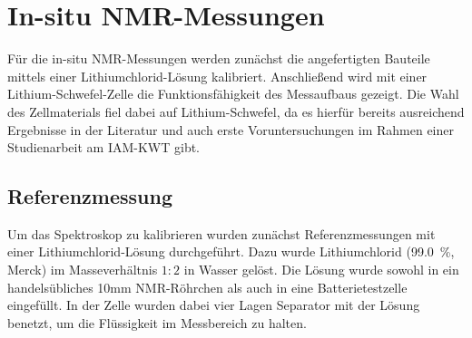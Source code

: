 \documentclass[a4paper, 11pt, headsepline,footsepline,twoside,abstract]{scrbook}
\begin{document}
\section{In-situ NMR-Messungen}
Für die in-situ NMR-Messungen werden zunächst die angefertigten Bauteile mittels einer Lithiumchlorid-Lösung kalibriert. Anschließend wird mit einer Lithium-Schwefel-Zelle die Funktionsfähigkeit des Messaufbaus gezeigt. Die Wahl des Zellmaterials fiel dabei auf Lithium-Schwefel, da es hierfür bereits ausreichend Ergebnisse in der Literatur und auch erste Voruntersuchungen im Rahmen einer Studienarbeit am IAM-KWT gibt.
\subsection{Referenzmessung}
Um das Spektroskop zu kalibrieren wurden zunächst Referenzmessungen mit einer Lithium\-chlorid-Lösung durchgeführt. Dazu wurde Lithiumchlorid (\SI{99.0}{\percent}, Merck) im Masseverhältnis $1:2$ in Wasser gelöst. Die Lösung wurde sowohl in ein handelsübliches 10mm NMR-Röhrchen als auch in eine Batterietestzelle eingefüllt. In der Zelle wurden dabei vier Lagen Separator mit der Lösung benetzt, um die Flüssigkeit im Messbereich zu halten.
\end{document}
